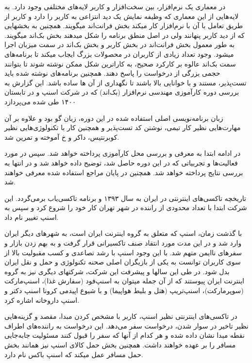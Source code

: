 \documentclass[a4]{report}
\begin{document}
در معماری یک نرم‌افزار، بین سخت‌افزار و کاربر لایه‌های مختلفی وجود دارد. به لایه‌هایی از این معماری که
وظیفه نمایش یک دید انتزاعی به کاربر را دارد و کاربر از طریق تعامل با آن با نرم‌افزار کار میکند بخش فرانت‌اند
میگویند. همچنین به بخشهایی که از دید کاربر پنهانند ولی در اصل منطق برنامه را شکل میدهند بخش بک‌اند
میگویند. به طور معمول بخش فرانت‌اند در بخش کاربر و بخش بک‌اند در سمت میزبان اجرا میشود.
 وجود تعداد زیادی از کاربران در محصولات بزرگ ایجاب میکند تا برنامه‌های سمت بک‌اند عالوه بر کارکرد
صحیح، به کارا‌ترین شکل ممکن نوشته شوند تا بتوانند حجمی بزرگی از درخواست را پاسخ دهند. همچنین
برنامه‌های نوشته شده باید تست‌پذیر، مستند و با خوانایی بالا باشند تا نگهداری از آن ها ساده باشد.
این گزارش به بررسی دوره کارآموزی مهندسی نرم‌افزار (بک‌اند) که در شرکت اسنپ و در تابستان ۱۴۰۰ طی شده می‌پردازد

زبان برنامه‌نویسی اصلی استفاده شده در این دوره، زبان گو بود و علاوه بر آن مهارت‌هایی نظیر کار تیمی، نوشتن کد تست‌پذیر و همچنین کار با تکنولوژی‌هایی نظیر کوبرنتیس، داکر و ‌خ آموخته و تمرین شد.

در ادامه ابتدا به معرفی و بررسی محل کارآموزی پرداخته خواهد شد. سپس در مورد فعالیت‌ها و تجربیاتی که
در این دوره حاصل شد، توضیح داده خواهد شد و در انتها به بررسی نتایج پرداخته خواهد شد. همچنین در پایان
مراجع استفاده شده معرفی خواهند شد.

تاریخچه تاکسی‌های اینترنتی در ایران به سال ۱۳۹۳ و برنامه تاکسی‌یاب برمی‌گردد. این شرکت ابتدا با
تعداد محدودی از راننده در شهر تهران کار خود را شروع کرد و سپس به اسنپ تغییر نام داد.

با گذشت زمان، اسنپ که متعلق به گروه اینترنت ایران است، به شهرهای دیگر ایران وارد شد و در این مدت مورد انتقاد صنف تاکسیرانی
قرار گرفت و به بهم زدن بازار و سفرهای ناایمن متهم شد. با این وجود اسنپ با رشد تصاعدی و کسب مقبولیت
بالا از سوی کاربران توانست به یکی از بازیگران اصلی صحنه تکنولوژی و حمل و نقل ایران بدل شود. در طی این
سالها و پیشرفت این شرکت، شرکتهای دیگری نیز به گروه اینترنت ایران پیوستند که از آن جمله میتوان به
اسنپ‌فود (سفارش غذا)، اسنپ‌مارکت (سوپرمارکت)، اسنپ‌تریپ (هتل و بلیط هواپیما) و با شیوع اپیدمی کرونا اسنپ دکتر و اسنپ داروخانه اشاره کرد.

در تاکسی‌های اینترنتی نظیر اسنپ، کاربر با مشخص کردن مبدا، مقصد و گزینه‌هایی نظیر تاخیر در سوار
شدن، درخواست سفر می‌دهد. این درخواست به راننده‌های اطراف نقطه مبدا نشان داده شده و هر کدام از آنها
که سفر را قبول کنند مسئولیت جابه‌جایی مسافر را بر عهده خواهند داشت. همچنین بخش حمل کالای اسنپ
نیز همانند بخش حمل مسافر عمل میکند که اسنپ باکس نام دارد.
\end{document}

